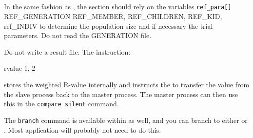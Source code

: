 \subsection{\kuplot}

In the same fashion as \Discus, the \Kuplot section should rely 
on the variables {\tt ref\_para[]}
REF\_GENERATION REF\_MEMBER, REF\_CHILDREN, REF\_KID, ref\_INDIV 
to determine the population size and if necessary the 
trial parameters. Do not read the GENERATION file.

Do not write a result file. The \Kuplot instruction:
\begin{MacVerbatim}
rvalue 1, 2
\end{MacVerbatim}

stores the weighted R-value internally and instructs the \Suite to
transfer the value from the slave process back to the master process.
The master process can then use this in the {\tt compare silent} command.

The {\tt branch} command is available within \Kuplot as well, and you
can branch to either \Diffev or \Discus. Most application will probably 
not need to do this.
